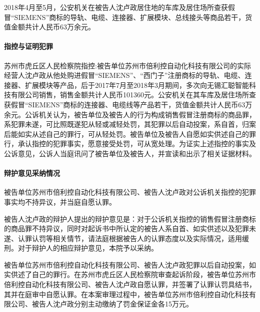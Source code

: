 \documentclass[
    a4paper
    ]{ctexart}
\begin{document}
{\begin{sloppy}
2018年4月至5月，公安机关在被告人沈卢政居住地的车库及居住场所查获假冒“SIEMENS”商标的导轨、电缆、连接器、扩展模块、总线接头等商品若干，货值金额共计人民币63万余元。

\paragraph{指控与证明犯罪}
苏州市虎丘区人民检察院指控:被告单位苏州市倍利控自动化科技有限公司的实际经营人沈卢政从他处购进假冒“SIEMENS”、“西门子”注册商标的导轨、电缆、连接器、扩展模块等产品，后于2017年7月至2018年3月期间，多次向无锡汇聪智能科技有限公司销售，销售金额共计人民币101360元。公安机关在其车库及居住场所查获假冒“SIEMENS”商标的连接器、电缆线等产品若干，货值金额共计人民币63万余元。公诉机关认为，被告单位及被告人的行为构成销售假冒注册商标的商品罪，系犯罪未遂，可比照既遂犯从轻或减轻处罚，其犯罪以后自动投案，系自首，归案后能如实从述自己的罪行，可从轻处罚。被告单位及被告人自愿如实供述自己的罪行，承认指控的犯罪事实，愿意接受处罚，可从宽处理。为证实上述指控的事实及公诉意见，公诉人当庭讯问了被告单位及被告人，并宣读和出示了相关证据材料。

\paragraph{辩护意见采纳情况}
被告单位苏州市倍利控自动化科技有限公司、被告人沈卢政对公诉机关指控的犯罪事实均不持异议，并当庭自愿认罪。

被告人沈卢政的辩护人提出的辩护意见是：对于公诉机关指控的销售假冒注册商标的商品罪不持异议，同时对起诉书中所认定的被告人系自首、如实供述以及犯罪未遂、认罪认罚等相关情节，请法庭根据被告人的认罪态度以及实际情况，适用缓刑。对于辩护人的相应辩护意见，本院予以采纳。

被告单位苏州市倍利控自动化科技有限公司、被告人沈卢政犯罪以后自动投案，如实供述了自己的罪行。在苏州市虎丘区人民检察院审查起诉阶段，被告单位苏州市倍利控自动化科技有限公司、被告人沈卢政自愿认罪，并签署了认罪认罚具结书，其并在庭审中自愿认罪。在本案审理过程中，被告单位苏州市倍利控自动化科技有限公司、被告人沈卢政分别主动缴纳了罚金保证金各15万元。



\end{sloppy}}
\end{document}

